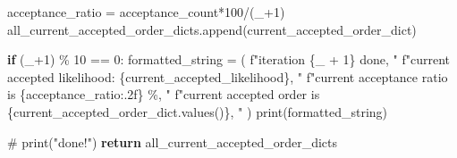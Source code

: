 \documentclass[
  letterpaper,
  DIV=11,
  numbers=noendperiod]{scrreprt}
\newenvironment{Shaded}{\begin{snugshade}}{\end{snugshade}}
\newcommand{\BuiltInTok}[1]{\textcolor[rgb]{0.00,0.23,0.31}{#1}}
\newcommand{\CommentTok}[1]{\textcolor[rgb]{0.37,0.37,0.37}{#1}}
\newcommand{\ControlFlowTok}[1]{\textcolor[rgb]{0.00,0.23,0.31}{\textbf{#1}}}
\newcommand{\DecValTok}[1]{\textcolor[rgb]{0.68,0.00,0.00}{#1}}
\newcommand{\NormalTok}[1]{\textcolor[rgb]{0.00,0.23,0.31}{#1}}
\newcommand{\OperatorTok}[1]{\textcolor[rgb]{0.37,0.37,0.37}{#1}}
\newcommand{\SpecialCharTok}[1]{\textcolor[rgb]{0.37,0.37,0.37}{#1}}
\newcommand{\SpecialStringTok}[1]{\textcolor[rgb]{0.13,0.47,0.30}{#1}}
\begin{document}
\begin{Shaded}
\begin{Highlighting}[]
\NormalTok{        acceptance\_ratio }\OperatorTok{=}\NormalTok{ acceptance\_count}\OperatorTok{*}\DecValTok{100}\OperatorTok{/}\NormalTok{(\_}\OperatorTok{+}\DecValTok{1}\NormalTok{)}
\NormalTok{        all\_current\_accepted\_order\_dicts.append(current\_accepted\_order\_dict)}

        \ControlFlowTok{if}\NormalTok{ (\_}\OperatorTok{+}\DecValTok{1}\NormalTok{) }\OperatorTok{\%} \DecValTok{10} \OperatorTok{==} \DecValTok{0}\NormalTok{:}
\NormalTok{            formatted\_string }\OperatorTok{=}\NormalTok{ (}
                \SpecialStringTok{f"iteration }\SpecialCharTok{\{}\NormalTok{\_ }\OperatorTok{+} \DecValTok{1}\SpecialCharTok{\}}\SpecialStringTok{ done, "}
                \SpecialStringTok{f"current accepted likelihood: }\SpecialCharTok{\{}\NormalTok{current\_accepted\_likelihood}\SpecialCharTok{\}}\SpecialStringTok{, "}
                \SpecialStringTok{f"current acceptance ratio is }\SpecialCharTok{\{}\NormalTok{acceptance\_ratio}\SpecialCharTok{:.2f\}}\SpecialStringTok{ \%, "}
                \SpecialStringTok{f"current accepted order is }\SpecialCharTok{\{}\NormalTok{current\_accepted\_order\_dict}\SpecialCharTok{.}\NormalTok{values()}\SpecialCharTok{\}}\SpecialStringTok{, "}
\NormalTok{            )}
            \BuiltInTok{print}\NormalTok{(formatted\_string)}

    \CommentTok{\# print("done!")}
    \ControlFlowTok{return}\NormalTok{ all\_current\_accepted\_order\_dicts}
\end{Highlighting}
\end{Shaded}
\end{document}
